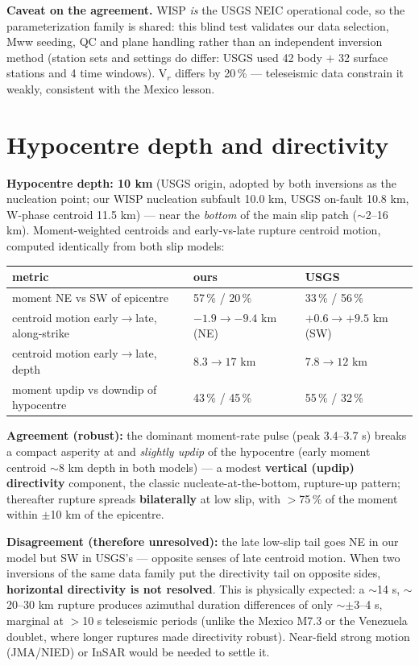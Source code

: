 \documentclass[11pt]{article}
\begin{document}
\textbf{Caveat on the agreement.} WISP \emph{is} the USGS NEIC operational code, so the
parameterization family is shared: this blind test validates our data selection, Mww seeding, QC
and plane handling rather than an independent inversion method (station sets and settings do
differ: USGS used 42 body $+$ 32 surface stations and 4 time windows). V$_r$ differs by 20\,\% ---
teleseismic data constrain it weakly, consistent with the Mexico lesson.

\section{Hypocentre depth and directivity}
\textbf{Hypocentre depth: 10 km} (USGS origin, adopted by both inversions as the nucleation
point; our WISP nucleation subfault 10.0 km, USGS on-fault 10.8 km, W-phase centroid 11.5 km)
--- near the \emph{bottom} of the main slip patch ($\sim$2--16 km). Moment-weighted centroids
and early-vs-late rupture centroid motion, computed identically from both slip models:

\begin{table}[H]\centering\small
\begin{tabular}{lll}
\toprule
metric & ours & USGS \\
\midrule
moment NE vs SW of epicentre & 57\,\% / 20\,\% & 33\,\% / 56\,\% \\
centroid motion early$\to$late, along-strike & $-1.9 \to -9.4$ km (NE) & $+0.6 \to +9.5$ km (SW) \\
centroid motion early$\to$late, depth & $8.3 \to 17$ km & $7.8 \to 12$ km \\
moment updip vs downdip of hypocentre & 43\,\% / 45\,\% & 55\,\% / 32\,\% \\
\bottomrule
\end{tabular}
\end{table}

\textbf{Agreement (robust):} the dominant moment-rate pulse (peak 3.4--3.7 s) breaks a compact
asperity at and \emph{slightly updip} of the hypocentre (early moment centroid $\sim$8 km depth
in both models) --- a modest \textbf{vertical (updip) directivity} component, the classic
nucleate-at-the-bottom, rupture-up pattern; thereafter rupture spreads \textbf{bilaterally} at
low slip, with $>$75\,\% of the moment within $\pm$10 km of the epicentre.

\textbf{Disagreement (therefore unresolved):} the late low-slip tail goes NE in our model but SW
in USGS's --- opposite senses of late centroid motion. When two inversions of the same data
family put the directivity tail on opposite sides, \textbf{horizontal directivity is not
resolved}. This is physically expected: a $\sim$14 s, $\sim$20--30 km rupture produces azimuthal
duration differences of only $\sim\pm$3--4 s, marginal at $>$10 s teleseismic periods (unlike the
Mexico M7.3 or the Venezuela doublet, where longer ruptures made directivity robust). Near-field
strong motion (JMA/NIED) or InSAR would be needed to settle it.
\end{document}
